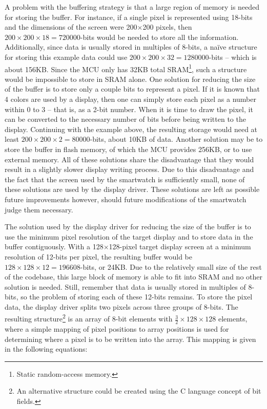 A problem with the buffering strategy is that a large region of memory is needed for storing the buffer. For instance, if a single pixel is represented using 18-bits and the dimensions of the screen were 200$\times$200 pixels, then $200\times200\times18 = 720000$-bits would be needed to store all the information. Additionally, since data is usually stored in multiples of 8-bits, a na\"ive structure for storing this example data could use $200\times200\times32 = 1280000$-bits -- which is about 156KB. Since the MCU only has 32KB total SRAM\footnote{Static random-access memory.}, such a structure would be impossible to store in SRAM alone. One solution for reducing the size of the buffer is to store only a couple bits to represent a pixel. If it is known that 4 colors are used by a display, then one can simply store each pixel as a number within 0 to 3 -- that is, as a 2-bit number. When it is time to draw the pixel, it can be converted to the necessary number of bits before being written to the display. Continuing with the example above, the resulting storage would need at least $200\times200\times2 = 80000$-bits, about 10KB of data. Another solution may be to store the buffer in flash memory, of which the MCU provides 256KB, or to use external memory. All of these solutions share the disadvantage that they would result in a slightly slower display writing process. Due to this disadvantage and the fact that the screen used by the smartwatch is sufficiently small, none of these solutions are used by the display driver. These solutions are left as possible future improvements however, should future modifications of the smartwatch judge them necessary.

The solution used by the display driver for reducing the size of the buffer is to use the minimum pixel resolution of the target display and to store data in the buffer contiguously. With a 128$\times$128-pixel target display screen at a minimum resolution of 12-bits per pixel, the resulting buffer would be $128\times128\times12 = 196608$-bits, or 24KB. Due to the relatively small size of the rest of the codebase, this large block of memory is able to fit into SRAM and no other solution is needed. Still, remember that data is usually stored in multiples of 8-bits, so the problem of storing each of these 12-bits remains. To store the pixel data, the display driver splits two pixels across three groups of 8-bits. The resulting structure\footnote{An alternative structure could be created using the C language concept of bit fields\cite{wikiBF}.} is an array of 8-bit elements with $\frac{3}{2}\times128\times128$ elements, where a simple mapping of pixel positions to array positions is used for determining where a pixel is to be written into the array. This mapping is given in the following equations:

